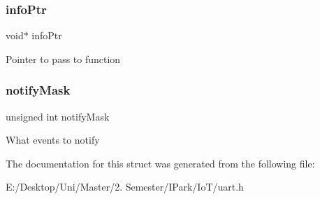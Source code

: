 \subsubsection{\texorpdfstring{info\+Ptr}{infoPtr}}
{\footnotesize\ttfamily void$\ast$ info\+Ptr}

Pointer to pass to function \mbox{\label{struct_u_a_r_t___notify_info__t_ab1ba4c6292ebde426204d8c2b2ac9154}} 
\subsubsection{\texorpdfstring{notify\+Mask}{notifyMask}}
{\footnotesize\ttfamily unsigned int notify\+Mask}

What events to notify 

The documentation for this struct was generated from the following file\+:\begin{DoxyCompactItemize}
\item 
E\+:/\+Desktop/\+Uni/\+Master/2. Semester/\+I\+Park/\+Io\+T/uart.\+h\end{DoxyCompactItemize}
